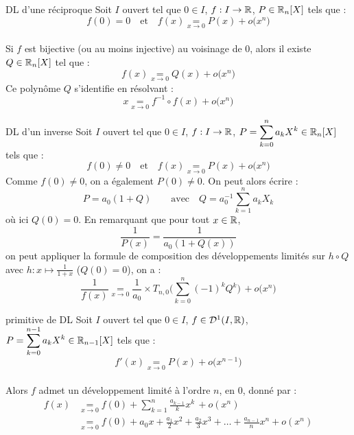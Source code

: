 \begin{adjustwidth}{-3cm}{-3cm}
\begin{proposition}{25.62}{DL d'une réciproque}
    Soit $I$ ouvert tel que $0 \in I$, $f:I \to \mathbb{R}$, $P \in \mathbb{R}_n[X]$ tels que :
    $$f(0) = 0 \quad \text{et} \quad   f(x) \underset{x \to 0}{=} P(x)  + o\bigl(x^n\bigr)$$ \\
    Si $f$ est bijective (ou au moins injective) au voisinage de $0$, alors il existe $Q \in \mathbb{R}_n[X]$ tel que :
    $$f(x) \underset{x \to 0}{=} Q(x)  + o\bigl(x^n\bigr)$$
    Ce polynôme $Q$ s'identifie en résolvant :
    $$x \underset{x \to 0}{=} f^{-1} \circ f(x) + o\bigl(x^n\bigr)$$
\end{proposition}

\begin{proposition}{25.65}{DL d'un inverse}
    Soit $I$ ouvert tel que $0 \in I$, $f:I \to \mathbb{R}$, $ \displaystyle P = \sum_{k=0}^{n}a_kX^k \in \mathbb{R}_n[X]$ tels que : 
    $$f(0) \neq 0 \quad \text{et} \quad   f(x) \underset{x \to 0}{=} P(x)  + o\bigl(x^n\bigr)$$
    Comme $f(0) \neq 0$, on a également $P(0) \neq 0$. On peut alors écrire :
    $$P = a_0(1 +  Q ) \qquad \text{avec} \quad Q = a_0^{-1} \sum_{k=1}^{n}a_kX_k$$
    où ici $Q(0) = 0$. En remarquant que pour tout $x \in \mathbb{R}$, 
    $$\frac{1}{P(x)} = \frac{1}{a_0(1+Q(x))}$$
    on peut appliquer la formule de composition des développements limités sur $h \circ Q$ avec $h:x \mapsto \frac{1}{1+x} $ ($Q(0) = 0$), on a :\\
    $$\frac{1}{f(x)} \underset{x \to 0}{=} \frac{1}{a_0} \times T_{n,0}\Biggl(\sum_{k=0}^{n}(-1)^k Q^k\Biggr) \, + o\bigl(x^n\bigr)$$
\end{proposition}

\begin{proposition}{25.65}{primitive de DL}
    Soit $I$ ouvert tel que $0 \in I$, $f \in \mathcal{D}^1(I,\mathbb{R}) $, $ \displaystyle P = \sum_{k=0}^{n-1}a_kX^k \in \mathbb{R}_{n-1}[X]$ tels que :
    $$f'(x) \underset{x \to 0}{=} P(x)  + o\bigl(x^{n-1}\bigr)$$\\
    Alors $f$ admet un développement limité à l'ordre $n$, en $0$, donné par :
    \begin{align*}
        f(x) &\underset{x \to 0}{=} f(0) + \sum_{k=1}^{n} \frac{a_{k-1}}{k} x^k \, + o(x^n) \\
        &\underset{x \to 0}{=} f(0) + a_0x + \frac{a_1}{2}x^2 + \frac{a_2}{3}x^3 + \dots + \frac{a_{n-1}}{n}x^n + o(x^n)
     \end{align*}
\end{proposition}






\end{adjustwidth}
